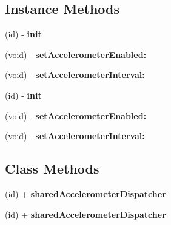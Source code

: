 \subsection*{Instance Methods}
\begin{DoxyCompactItemize}
\item 
\mbox{\label{interfaceCCAccelerometerDispatcher_aca5b358a57496d8d843d400316e3c08f}} 
(id) -\/ {\bfseries init}
\item 
\mbox{\label{interfaceCCAccelerometerDispatcher_a86a67a10a50f181c5b81a5a35f919de5}} 
(void) -\/ {\bfseries set\+Accelerometer\+Enabled\+:}
\item 
\mbox{\label{interfaceCCAccelerometerDispatcher_af3e26b304b5f2315b6dd4c334c628fc7}} 
(void) -\/ {\bfseries set\+Accelerometer\+Interval\+:}
\item 
\mbox{\label{interfaceCCAccelerometerDispatcher_aca5b358a57496d8d843d400316e3c08f}} 
(id) -\/ {\bfseries init}
\item 
\mbox{\label{interfaceCCAccelerometerDispatcher_a86a67a10a50f181c5b81a5a35f919de5}} 
(void) -\/ {\bfseries set\+Accelerometer\+Enabled\+:}
\item 
\mbox{\label{interfaceCCAccelerometerDispatcher_af3e26b304b5f2315b6dd4c334c628fc7}} 
(void) -\/ {\bfseries set\+Accelerometer\+Interval\+:}
\end{DoxyCompactItemize}
\subsection*{Class Methods}
\begin{DoxyCompactItemize}
\item 
\mbox{\label{interfaceCCAccelerometerDispatcher_adf5e5629f4da519075953c0b178bc3eb}} 
(id) + {\bfseries shared\+Accelerometer\+Dispatcher}
\item 
\mbox{\label{interfaceCCAccelerometerDispatcher_adf5e5629f4da519075953c0b178bc3eb}} 
(id) + {\bfseries shared\+Accelerometer\+Dispatcher}
\end{DoxyCompactItemize}
